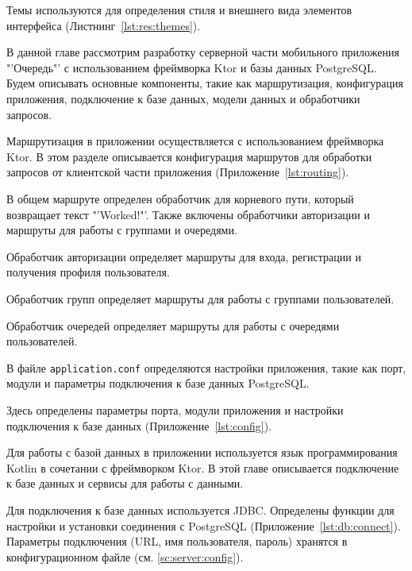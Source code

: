 Темы используются для определения стиля и внешнего вида элементов интерфейса
(Листнинг~\ref{lst:res:themes}).



В данной главе рассмотрим разработку серверной части мобильного приложения
"'Очередь"' с использованием фреймворка Ktor и базы данных PostgreSQL.
Будем описывать основные компоненты, такие как маршрутизация,
конфигурация приложения, подключение к базе данных,
модели данных и обработчики запросов.


Маршрутизация в приложении осуществляется с использованием фреймворка Ktor.
В этом разделе описывается конфигурация маршрутов
для обработки запросов от клиентской части приложения
(Приложение~\ref{lst:routing}).

В общем маршруте определен обработчик для корневого пути,
который возвращает текст "'Worked!"'.
Также включены обработчики авторизации
и маршруты для работы с группами и очередями.

Обработчик авторизации определяет маршруты для входа,
регистрации и получения профиля пользователя.

Обработчик групп определяет маршруты для работы с группами пользователей.

Обработчик очередей определяет маршруты для работы с очередями пользователей.

\label{sc:server:config}

В файле \texttt{application.conf} определяются настройки приложения,
такие как порт, модули и параметры подключения к базе данных PostgreSQL.\par
Здесь определены параметры порта, модули приложения
и настройки подключения к базе данных (Приложение~\ref{lst:config}).


Для работы с базой данных в приложении используется язык программирования Kotlin в сочетании с фреймворком Ktor. В этой главе описывается подключение к базе данных и сервисы для работы с данными.

Для подключения к базе данных используется JDBC.
Определены функции для настройки и установки соединения с PostgreSQL
(Приложение~\ref{lst:db:connect}).
Параметры подключения (URL, имя пользователя, пароль)
хранятся в конфигурационном файле (см. \ref{sc:server:config}).\par

